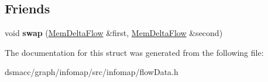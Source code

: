 \subsection*{Friends}
\begin{DoxyCompactItemize}
\item 
\mbox{\label{structMemDeltaFlow_a1b94b179851acf68dcd48647edbe1c56}} 
void {\bfseries swap} (\mbox{\hyperlink{structMemDeltaFlow}{Mem\+Delta\+Flow}} \&first, \mbox{\hyperlink{structMemDeltaFlow}{Mem\+Delta\+Flow}} \&second)
\end{DoxyCompactItemize}


The documentation for this struct was generated from the following file\+:\begin{DoxyCompactItemize}
\item 
dsmacc/graph/infomap/src/infomap/flow\+Data.\+h\end{DoxyCompactItemize}
